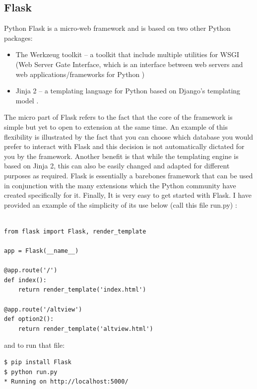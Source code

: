 \subsection{Flask}
Python Flask is a micro-web framework and is based on two other Python packages:
\begin{itemize}
	\item The Werkzeug toolkit – a toolkit that include multiple utilities for WSGI (Web Server Gate Interface, which is an interface between web servers and web applications/frameworks for Python \cite{werkzeug})
	\item Jinja 2 – a templating language for Python based on Django’s templating model \cite{jinja2}.
\end{itemize}
The micro part of Flask refers to the fact that the core of the framework is simple but yet to open to extension at the same time. An example of this flexibility is illustrated by the fact that you can choose which database you would prefer to interact with Flask and this decision is not automatically dictated for you by the framework. Another benefit is that while the templating engine is based on Jinja 2, this can also be easily changed and adapted for different purposes as required. Flask is essentially a barebones framework that can be used in conjunction with the many extensions which the Python community have created specifically for it. Finally, It is very easy to get started with Flask. I have provided an example of the simplicity of its use below (call this file run.py) \cite{flask}:
\linebreak
\linebreak
\linebreak
\begin{verbatim}

from flask import Flask, render_template

app = Flask(__name__)

@app.route('/')
def index():
	return render_template('index.html')

@app.route('/altview')
def option2():
	return render_template('altview.html')
\end{verbatim}
and to run that file:
\begin{verbatim}
$ pip install Flask
$ python run.py
* Running on http://localhost:5000/
\end{verbatim}

